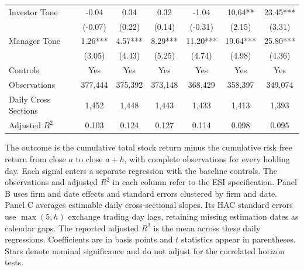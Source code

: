 \begin{table}[H]
\begin{threeparttable}
\begin{tabular*}{\textwidth}{@{\extracolsep{\fill}}lcccccc@{}}
Investor Tone & -0.04 & 0.34 & 0.32 & -1.04 & 10.64** & 23.45*** \\
 & (-0.07) & (0.22) & (0.14) & (-0.31) & (2.15) & (3.31) \\
Manager Tone & 1.26*** & 4.57*** & 8.29*** & 11.20*** & 19.64*** & 25.80*** \\
 & (3.05) & (4.43) & (5.25) & (4.74) & (4.98) & (4.36) \\
\midrule
Controls & Yes & Yes & Yes & Yes & Yes & Yes \\
Observations & 377,444 & 375,392 & 373,148 & 368,429 & 358,397 & 349,074 \\
Daily Cross Sections & 1,452 & 1,448 & 1,443 & 1,433 & 1,413 & 1,393 \\
Adjusted $R^2$ & 0.103 & 0.124 & 0.127 & 0.114 & 0.098 & 0.095 \\
\bottomrule
\end{tabular*}\par
\begin{tablenoteblock}
The outcome is the cumulative total stock return minus the cumulative risk free return from close $a$ to close $a+h$, with complete observations for every holding day. Each signal enters a separate regression with the baseline controls. The observations and adjusted $R^2$ in each column refer to the ESI specification. Panel B uses firm and date effects and standard errors clustered by firm and date. Panel C averages estimable daily cross-sectional slopes. Its HAC standard errors use $\max(5,h)$ exchange trading day lags, retaining missing estimation dates as calendar gaps. The reported adjusted $R^2$ is the mean across these daily regressions. Coefficients are in basis points and $t$ statistics appear in parentheses. Stars denote nominal significance and do not adjust for the correlated horizon tests.
\end{tablenoteblock}
\end{threeparttable}
\end{table}
